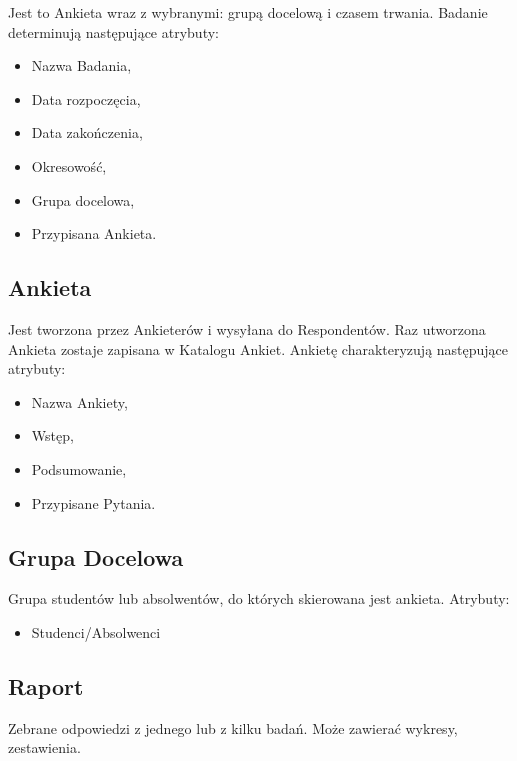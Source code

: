 Jest to Ankieta wraz z wybranymi: grupą docelową i czasem trwania. Badanie determinują następujące atrybuty:

\begin{itemize}
\item Nazwa Badania,
\item Data rozpoczęcia,
\item Data zakończenia,
\item Okresowość,
\item Grupa docelowa,
\item Przypisana Ankieta.
\end{itemize}

\subsection{Ankieta}
\label{Chapter222}

Jest tworzona przez Ankieterów i wysyłana do Respondentów. Raz utworzona Ankieta zostaje zapisana w Katalogu Ankiet. Ankietę charakteryzują następujące atrybuty:

\begin{itemize}
\item Nazwa Ankiety,
\item Wstęp,
\item Podsumowanie,
\item Przypisane Pytania.
\end{itemize}

\subsection{Grupa Docelowa}
\label{Chapter223}

Grupa studentów lub absolwentów, do których skierowana jest ankieta. Atrybuty:

\begin{itemize}
\item Studenci\slash Absolwenci
\end{itemize}

\subsection{Raport}
\label{Chapter224}

Zebrane odpowiedzi z jednego lub z kilku badań. Może zawierać wykresy, zestawienia.


%

